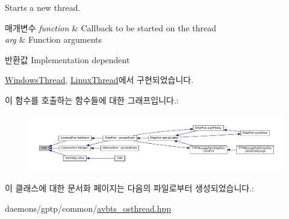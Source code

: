 Starts a new thread. 


\begin{DoxyParams}{매개변수}
{\em function} & Callback to be started on the thread \\
\hline
{\em arg} & Function arguments \\
\hline
\end{DoxyParams}
\begin{DoxyReturn}{반환값}
Implementation dependent 
\end{DoxyReturn}


\hyperlink{class_windows_thread_affcc04a68e6b3779523a4f1183ba03e9}{Windows\+Thread}, \hyperlink{class_linux_thread_a8a40b1f7308f392fe8b937260b561e31}{Linux\+Thread}에서 구현되었습니다.



이 함수를 호출하는 함수들에 대한 그래프입니다.\+:
\nopagebreak
\begin{figure}[H]
\begin{center}
\leavevmode
\includegraphics[width=350pt]{class_o_s_thread_a016d9f5a1958871bb32efd99100dcbc3_icgraph}
\end{center}
\end{figure}




이 클래스에 대한 문서화 페이지는 다음의 파일로부터 생성되었습니다.\+:\begin{DoxyCompactItemize}
\item 
daemons/gptp/common/\hyperlink{avbts__osthread_8hpp}{avbts\+\_\+osthread.\+hpp}\end{DoxyCompactItemize}
